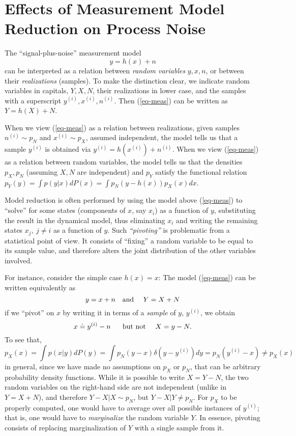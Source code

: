 \documentclass[]{article}
\begin{document}
\section{Effects of Measurement Model Reduction on Process Noise} 

The ``signal-plus-noise'' measurement model 
\begin{equation}
y = h(x) + n 
\label{eq-meas}
\end{equation}
can be interpreted as a relation between {\em random variables} $y, x, n$, or between their {\em realizations} (samples). To make the distinction clear, we indicate random variables in capitals, $Y, X, N$, their realizations in lower case, and the samples with a superscript $y^{(i)}, x^{(i)}, n^{(i)}$. Then (\ref{eq-meas}) can be written as $Y = h(X) + N$.

When we view (\ref{eq-meas}) as a relation between realizations, given samples $n^{(i)} \sim p_N$ and $x^{(i)} \sim p_X$, assumed independent, the model tells us that a sample $y^{(i)}$ is obtained via $y^{(i)} = h(x^{(i)}) + n^{(i)}$. When we view (\ref{eq-meas}) as a relation between random variables, the model tells us that the densities $p_X, p_N$ (assuming $X, N$ are independent) and $p_Y$ satisfy the functional relation $p_Y(y) = \int p(y | x) dP(x) = \int p_N(y-h(x))p_X(x)dx$. 

Model reduction is often performed by using the model above (\ref{eq-meas}) to ``solve'' for some states (components of $x$, say $x_i$) as a function of $y$, substituting the result in the dynamical model, thus eliminating $x_i$ and writing the remaining states $x_j, \ j \neq i$ as a function of $y$. Such {\em ``pivoting''} is problematic from a statistical point of view. It consists of ``fixing'' a random variable to be equal to its sample value, and therefore alters the joint distribution of the other variables involved. 

For instance, consider the simple case $h(x) = x$: The model (\ref{eq-meas}) can be written equivalently as
\begin{equation}
y = x + n ~~~{\rm and} ~~~~ Y = X + N
\end{equation}
if we ``pivot'' on $x$ by writing it in terms of a {\em sample} of $y$, $y^{(i)}$, we obtain
\begin{equation}
x \doteq y^{(i)} - n ~~~~~{\rm but \ not} ~~~~ X = y - N.
\end{equation}
To see that, 
\begin{equation}
p_X(x) = \int p(x | y) dP(y) = \int p_N(y - x) \delta(y - y^{(i)}) dy = p_N(y^{(i)} - x) \neq p_X(x)
\end{equation}
in general, since we have made no assumptions on $p_X$ or $p_N$, that can be arbitrary probability density functions. While it is possible to write $X = Y - N$, the two random variables on the right-hand side are not independent (unlike in $Y = X +N$), and therefore $Y - X | X \sim p_N$, but $ Y - X|Y \neq p_N$. For $p_X$ to be properly computed, one would have to average over all possible instances of $y^{(i)}$; that is, one would have to {\em marginalize} the random variable $Y$. In essence, pivoting consists of replacing marginalization of $Y$ with a single sample from it.
\end{document}
